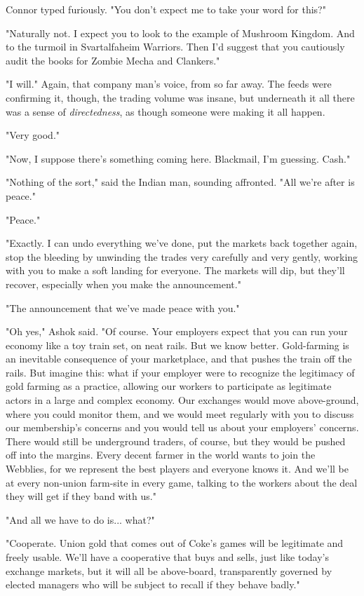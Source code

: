 Connor typed furiously. "You don't expect me to take your word for
this?"

"Naturally not. I expect you to look to the example of Mushroom
Kingdom. And to the turmoil in Svartalfaheim Warriors. Then I'd
suggest that you cautiously audit the books for Zombie Mecha and
Clankers."

"I will." Again, that company man's voice, from so far away. The
feeds were confirming it, though, the trading volume was insane,
but underneath it all there was a sense of \emph{directedness}, as
though someone were making it all happen.

"Very good."

"Now, I suppose there's something coming here. Blackmail, I'm
guessing. Cash."

"Nothing of the sort," said the Indian man, sounding affronted.
"All we're after is peace."

"Peace."

"Exactly. I can undo everything we've done, put the markets back
together again, stop the bleeding by unwinding the trades very
carefully and very gently, working with you to make a soft landing
for everyone. The markets will dip, but they'll recover, especially
when you make the announcement."

"The announcement that we've made peace with you."

"Oh yes," Ashok said. "Of course. Your employers expect that you
can run your economy like a toy train set, on neat rails. But we
know better. Gold-farming is an inevitable consequence of your
marketplace, and that pushes the train off the rails. But imagine
this: what if your employer were to recognize the legitimacy of
gold farming as a practice, allowing our workers to participate as
legitimate actors in a large and complex economy. Our exchanges
would move above-ground, where you could monitor them, and we would
meet regularly with you to discuss our membership's concerns and
you would tell us about your employers' concerns. There would still
be underground traders, of course, but they would be pushed off
into the margins. Every decent farmer in the world wants to join
the Webblies, for we represent the best players and everyone knows
it. And we'll be at every non-union farm-site in every game,
talking to the workers about the deal they will get if they band
with us."

"And all we have to do is... what?"

"Cooperate. Union gold that comes out of Coke's games will be
legitimate and freely usable. We'll have a cooperative that buys
and sells, just like today's exchange markets, but it will all be
above-board, transparently governed by elected managers who will be
subject to recall if they behave badly."

